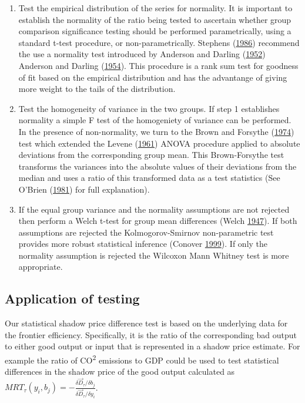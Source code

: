\documentclass[
  12pt,
]{article}
\begin{document}
\begin{enumerate}
\def\labelenumi{\arabic{enumi}.}
\item
  Test the empirical distribution of the series for normality. It is important to establish the normality of the ratio being tested to ascertain whether group comparison significance testing should be performed parametrically, using a standard t-test procedure, or non-parametrically. Stephens (\protect\hyperlink{ref-Stephens1986}{1986}) recommend the use a normality test introduced by Anderson and Darling (\protect\hyperlink{ref-Anderson1952}{1952}) Anderson and Darling (\protect\hyperlink{ref-Anderson1954}{1954}). This procedure is a rank sum test for goodness of fit based on the empirical distribution and has the advantange of giving more weight to the tails of the distribution.
\item
  Test the homogeneity of variance in the two groups. If step 1 establishes normality a simple F test of the homogeniety of variance can be performed. In the presence of non-normality, we turn to the Brown and Forsythe (\protect\hyperlink{ref-Brown1974}{1974}) test which extended the Levene (\protect\hyperlink{ref-Levene1961}{1961}) ANOVA procedure applied to absolute deviations from the corresponding group mean. This Brown-Forsythe test transforms the variances into the absolute values of their deviations from the median and uses a ratio of this transformed data as a test statistics (See O'Brien (\protect\hyperlink{ref-OBrien1981}{1981}) for full explanation).
\item
  If the equal group variance and the normality assumptions are not rejected then perform a Welch t-test for group mean differences (Welch \protect\hyperlink{ref-Welch1947}{1947}). If both assumptions are rejected the Kolmogorov-Smirnov non-parametric test provides more robust statistical inference (Conover \protect\hyperlink{ref-Conover1999}{1999}). If only the normality assumption is rejected the Wilcoxon Mann Whitney test is more appropriate.
\end{enumerate}

\hypertarget{application-of-testing}{%
\subsection{Application of testing}\label{application-of-testing}}

Our statistical shadow price difference test is based on the underlying data for the frontier efficiency. Specifically, it is the ratio of the corresponding bad output to either good output or input that is represented in a shadow price estimate. For example the ratio of CO\textsuperscript{2} emissions to GDP could be used to test statistical differences in the shadow price of the good output calculated as \(MRT_{\tau}(y_{i},b_{j})=-\frac{\delta \vec{D}_{\tau}/\delta b_{j}}{\delta \vec{D}_{\tau}/\delta y_{i}}\).
\end{document}
